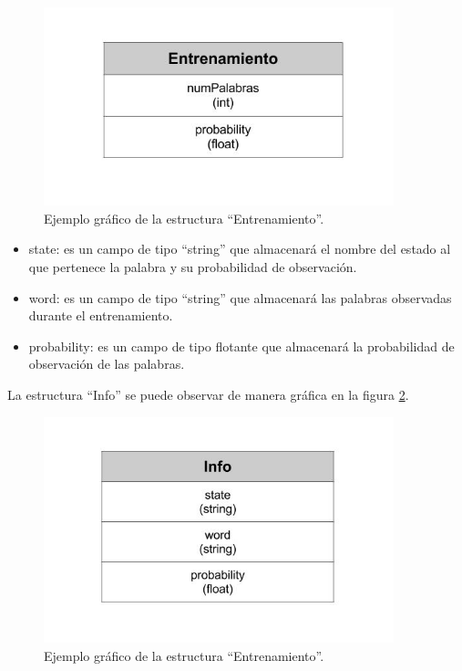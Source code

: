 \begin{figure}[!htb]
\begin{center}
\includegraphics[width=4in]{./img/EntrenamientoRegister.jpg}
\caption{Ejemplo gráfico de la estructura ``Entrenamiento''.}
\label{fig:figEntrenamiento}
\end{center}
\end{figure}	

\begin{itemize}
\item state: es un campo de tipo ``string'' que almacenará el nombre del
estado al que pertenece la palabra y su probabilidad de observación.
\item word: es un campo de tipo ``string'' que almacenará las palabras observadas durante el entrenamiento.
\item probability: es un campo de tipo flotante que almacenará la probabilidad de observación de las palabras.
\end{itemize}

La estructura ``Info'' se puede observar de manera gráfica en la figura
\ref{fig:figInfo}.

\begin{figure}[!htb]
\begin{center}
\includegraphics[width=4in]{./img/Info.jpg}
\caption{Ejemplo gráfico de la estructura ``Entrenamiento''.}
\label{fig:figInfo}
\end{center}
\end{figure}

